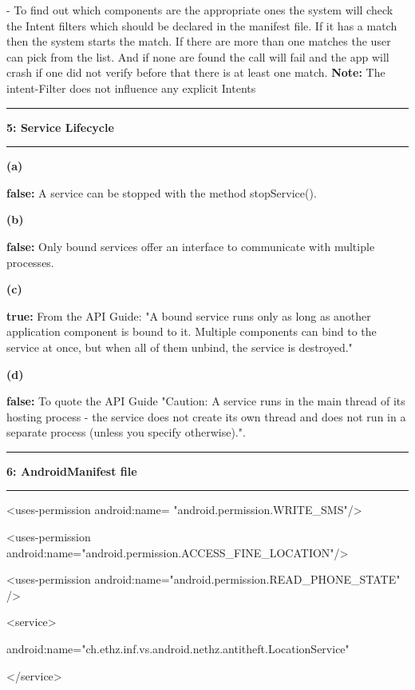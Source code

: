 \documentclass[11pt]{article}
\newcommand\question[2]{\vspace{.25in}\hrule\textbf{#1: #2}\vspace{.5em}\hrule\vspace{.10in}}
\renewcommand\part[1]{\vspace{.10in}\textbf{(#1)}}
\begin{document}
- To find out which components are the appropriate ones the system will check the Intent filters which should be declared in the manifest file.
If it has a match then the system starts the match. If there are more than one matches the user can pick from the list.
And if none are found the call will fail and the app will crash if one did not verify before that there is at least one match.\newline
\textbf{Note:} The intent-Filter does not influence any explicit Intents



\question{5}{Service Lifecycle} 

\part{a} 

\textbf{false:} A service can be stopped with the method stopService().

\part{b}

\textbf{false:} Only bound services offer an interface to communicate with multiple processes.

\part{c}

\textbf{true:} From the API Guide: "A bound service runs only as long as another application component is bound to it. Multiple components can bind to the service at once, but when all of them unbind, the service is destroyed."

\part{d}

\textbf{false:} To quote the API Guide "Caution: A service runs in the main thread of its hosting process - the service does not create its own thread and does not run in a separate process (unless you specify otherwise).".

\question{6}{AndroidManifest file}

 \textless uses-permission android:name= "android.permission.WRITE\_SMS"/\textgreater 
 
 
 \textless uses-permission android:name="android.permission.ACCESS\_FINE\_LOCATION"/\textgreater 
 
 
 \textless uses-permission android:name="android.permission.READ\_PHONE\_STATE" /\textgreater 
 
 \textless service\textgreater 
 
 	android:name="ch.ethz.inf.vs.android.nethz.antitheft.LocationService"
	 
 \textless /service\textgreater 
\end{document}
